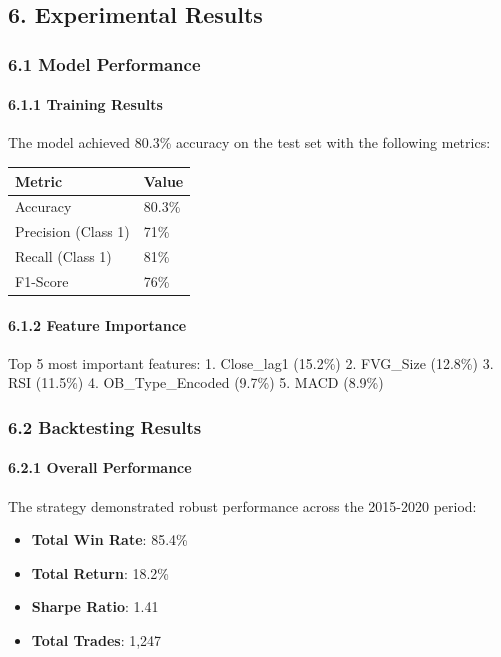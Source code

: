 \subsection{6. Experimental Results}\label{experimental-results}

\subsubsection{6.1 Model Performance}\label{model-performance}

\paragraph{6.1.1 Training Results}\label{training-results}

The model achieved 80.3\% accuracy on the test set with the following
metrics:

\begin{longtable}[]{@{}ll@{}}
\toprule\noalign{}
Metric & Value \\
\midrule\noalign{}
\endhead
\bottomrule\noalign{}
\endlastfoot
Accuracy & 80.3\% \\
Precision (Class 1) & 71\% \\
Recall (Class 1) & 81\% \\
F1-Score & 76\% \\
\end{longtable}

\paragraph{6.1.2 Feature Importance}\label{feature-importance}

Top 5 most important features: 1. Close\_lag1 (15.2\%) 2. FVG\_Size
(12.8\%) 3. RSI (11.5\%) 4. OB\_Type\_Encoded (9.7\%) 5. MACD (8.9\%)

\subsubsection{6.2 Backtesting Results}\label{backtesting-results}

\paragraph{6.2.1 Overall Performance}\label{overall-performance}

The strategy demonstrated robust performance across the 2015-2020
period:

\begin{itemize}
\tightlist
\item
  \textbf{Total Win Rate}: 85.4\%
\item
  \textbf{Total Return}: 18.2\%
\item
  \textbf{Sharpe Ratio}: 1.41
\item
  \textbf{Total Trades}: 1,247
\end{itemize}

